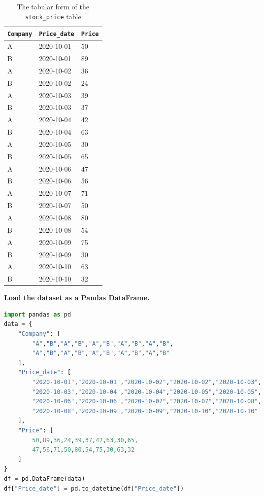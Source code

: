\begin{table}[H]
  \centering
  \caption[Stock price table]{The tabular form of the \texttt{stock\_price} table}
  \label{tab:stock_price}
  \begin{tabular}{@{}lll@{}}
    \toprule
    \texttt{Company} & \texttt{Price\_date} & \texttt{Price} \\
    \midrule
    A & 2020-10-01 & 50 \\
    B & 2020-10-01 & 89 \\
    A & 2020-10-02 & 36 \\
    B & 2020-10-02 & 24 \\
    A & 2020-10-03 & 39 \\
    B & 2020-10-03 & 37 \\
    A & 2020-10-04 & 42 \\
    B & 2020-10-04 & 63 \\
    A & 2020-10-05 & 30 \\
    B & 2020-10-05 & 65 \\
    A & 2020-10-06 & 47 \\
    B & 2020-10-06 & 56 \\
    A & 2020-10-07 & 71 \\
    B & 2020-10-07 & 50 \\
    A & 2020-10-08 & 80 \\
    B & 2020-10-08 & 54 \\
    A & 2020-10-09 & 75 \\
    B & 2020-10-09 & 30 \\
    A & 2020-10-10 & 63 \\
    B & 2020-10-10 & 32 \\
    \bottomrule
  \end{tabular}
\end{table}

\noindent\textbf{Load the dataset as a Pandas DataFrame.}

\begin{lstlisting}[language=Python,
  basicstyle=\ttfamily\small,
  backgroundcolor=\color{gray!10},
  caption={[Python baseline dataset]Python baseline dataset.},
  label={lst:dataset}]
import pandas as pd
data = {
    "Company": [
        "A","B","A","B","A","B","A","B","A","B",
        "A","B","A","B","A","B","A","B","A","B"
    ],
    "Price_date": [
        "2020-10-01","2020-10-01","2020-10-02","2020-10-02","2020-10-03",
        "2020-10-03","2020-10-04","2020-10-04","2020-10-05","2020-10-05",
        "2020-10-06","2020-10-06","2020-10-07","2020-10-07","2020-10-08",
        "2020-10-08","2020-10-09","2020-10-09","2020-10-10","2020-10-10"
    ],
    "Price": [
        50,89,36,24,39,37,42,63,30,65,
        47,56,71,50,80,54,75,30,63,32
    ]
}
df = pd.DataFrame(data)
df["Price_date"] = pd.to_datetime(df["Price_date"])
\end{lstlisting}

